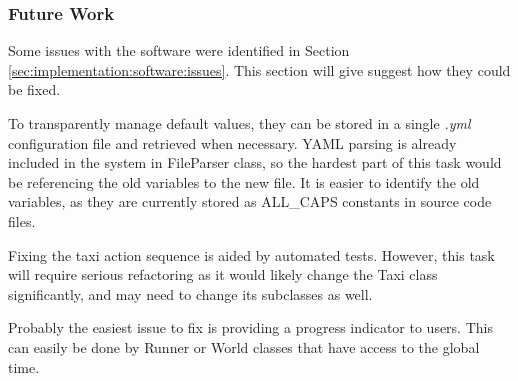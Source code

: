 \subsubsection{Future Work}

Some issues with the software were identified in Section
\ref{sec:implementation:software:issues}. This section will give suggest how
they could be fixed.

To transparently manage default values, they can be stored in a single
\textit{.yml} configuration file and retrieved when necessary. YAML parsing is
already included in the system in FileParser class, so the hardest part of this
task would be referencing the old variables to the new file. It is easier to
identify the old variables, as they are currently stored as ALL\_CAPS constants
in source code files.

Fixing the taxi action sequence is aided by automated tests. However, this task
will require serious refactoring as it would likely change the Taxi class
significantly, and may need to change its subclasses as well.

Probably the easiest issue to fix is providing a progress indicator to users.
This can easily be done by Runner or World classes that have access to the
global time.
